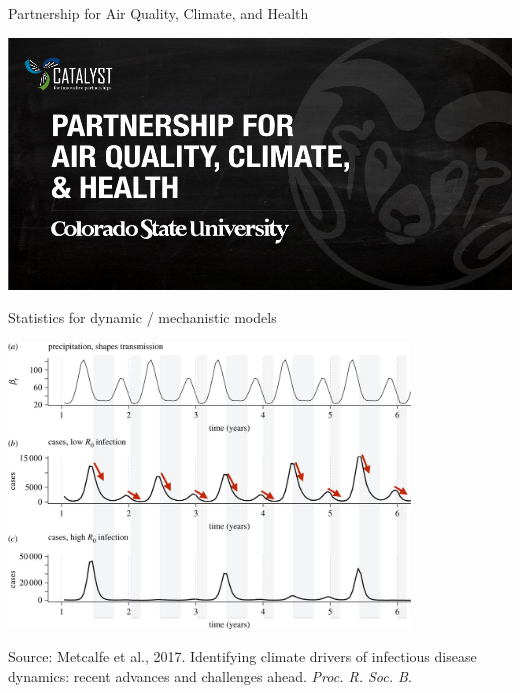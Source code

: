 \documentclass[ignorenonframetext,]{beamer}
\begin{document}
\begin{frame}{Partnership for Air Quality, Climate, and Health}

\begin{center}\includegraphics[width=\textwidth]{figures/PAQCH} \end{center}

\end{frame}

\begin{frame}{Statistics for dynamic / mechanistic models}

\begin{center}\includegraphics[width=0.8\textwidth]{figures/F1large} \end{center}

\footnotesize{Source: Metcalfe et al., 2017. Identifying climate drivers of infectious disease dynamics: recent advances and challenges ahead. \textit{Proc. R. Soc. B}.}

\end{frame}
\end{document}
